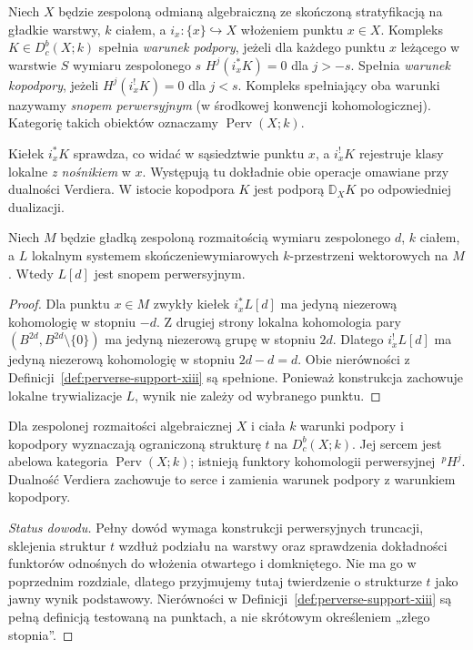 \begin{definicja}
\label{def:perverse-support-xiii}
Niech $X$ będzie zespoloną odmianą algebraiczną
ze skończoną stratyfikacją na gładkie warstwy,
$k$ ciałem, a $i_x:\{x\}\hookrightarrow X$ włożeniem
punktu $x\in X$. Kompleks $K\in D_c^b(X;k)$ spełnia
\emph{warunek podpory}, jeżeli dla każdego punktu $x$
leżącego w warstwie $S$ wymiaru zespolonego $s$
$H^j(i_x^*K)=0$ dla $j>-s$.
Spełnia \emph{warunek kopodpory}, jeżeli
$H^j(i_x^!K)=0$ dla $j<s$.
Kompleks spełniający oba warunki nazywamy
\emph{snopem perwersyjnym} (w środkowej konwencji
kohomologicznej). Kategorię takich obiektów oznaczamy
$\operatorname{Perv}(X;k)$.
\end{definicja}
\begin{uwaga}
Kiełek $i_x^*K$ sprawdza, co widać w sąsiedztwie
punktu $x$, a $i_x^!K$ rejestruje klasy lokalne
\emph{z nośnikiem} w $x$. Występują tu dokładnie
obie operacje omawiane przy dualności Verdiera.
W istocie kopodpora $K$ jest podporą
$\mathbb D_XK$ po odpowiedniej dualizacji.
\end{uwaga}

\begin{stwierdzenie}
\label{prop:smooth-perverse-xiii}
Niech $M$ będzie gładką zespoloną rozmaitością
wymiaru zespolonego $d$, $k$ ciałem, a $L$ lokalnym
systemem skończeniewymiarowych $k$-przestrzeni wektorowych
na $M$. Wtedy $L[d]$ jest snopem perwersyjnym.
\end{stwierdzenie}
\begin{proof}
Dla punktu $x\in M$ zwykły kiełek $i_x^*L[d]$
ma jedyną niezerową kohomologię w stopniu $-d$.
Z drugiej strony lokalna kohomologia pary
$(B^{2d},B^{2d}\setminus\{0\})$ ma jedyną niezerową
grupę w stopniu $2d$. Dlatego $i_x^!L[d]$
ma jedyną niezerową kohomologię w stopniu
$2d-d=d$. Obie nierówności z
Definicji~\ref{def:perverse-support-xiii}
są spełnione. Ponieważ konstrukcja zachowuje
lokalne trywializacje $L$, wynik nie zależy od
wybranego punktu.
\end{proof}

\begin{twierdzenie}
\label{thm:heart-perverse-xiii}
Dla zespolonej rozmaitości algebraicznej $X$
i ciała $k$ warunki podpory i kopodpory wyznaczają
ograniczoną strukturę $t$ na $D_c^b(X;k)$.
Jej sercem jest abelowa kategoria
$\operatorname{Perv}(X;k)$; istnieją funktory
kohomologii perwersyjnej $\,{}^p\!H^j$.
Dualność Verdiera zachowuje to serce i zamienia
warunek podpory z warunkiem kopodpory.
\end{twierdzenie}
\begin{proof}[Status dowodu]
Pełny dowód wymaga konstrukcji perwersyjnych
truncacji, sklejenia struktur $t$ wzdłuż podziału
na warstwy oraz sprawdzenia dokładności funktorów
odnośnych do włożenia otwartego i domkniętego.
Nie ma go w poprzednim rozdziale, dlatego
przyjmujemy tutaj twierdzenie o strukturze $t$
jako jawny wynik podstawowy. Nierówności w
Definicji~\ref{def:perverse-support-xiii}
są pełną definicją testowaną na punktach,
a nie skrótowym określeniem „złego stopnia”.
\end{proof}


